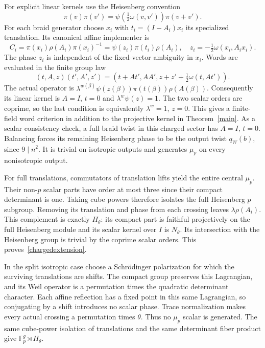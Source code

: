 \documentclass[11pt]{amsart}
\newcommand{\Fp}{\mathbb F_p}
\begin{document}
For explicit linear kernels use the Heisenberg convention
\[
\pi(v)\pi(v')=\psi(\tfrac12\omega(v,v'))\pi(v+v').
\]
For each braid generator choose $x_i$ with
$t_i=(I-A_i)x_i$ its specialized translation. Its canonical affine
implementer is
\[
C_i=\pi(x_i)\rho(A_i)\pi(x_i)^{-1}
=\psi(z_i)\pi(t_i)\rho(A_i),\quad
z_i=-\tfrac12\omega(x_i,A_ix_i).
\]
The phase $z_i$ is independent of the fixed-vector ambiguity in $x_i$.
Words are evaluated in the finite group law
\[
(t,A,z)(t',A',z')=
(t+At',AA',z+z'+\tfrac12\omega(t,At')).
\]
The actual operator is $\lambda^{w(\beta)}\psi(z(\beta))
\pi(t(\beta))\rho(A(\beta))$. Consequently its linear kernel is
$A=I$, $t=0$ and $\lambda^w\psi(z)=1$. The two scalar orders are
coprime, so the last condition is equivalently $\lambda^w=1$, $z=0$.
This gives a finite-field word criterion in addition to the projective
kernel in Theorem~\ref{main}.
As a scalar consistency check, a full braid twist in this charged
sector has $A=I$, $t=0$. Balancing forces its remaining Heisenberg
phase to be the output twist $q_W(b)$, since $9\mid n^2$.
It is trivial on isotropic outputs and generates $\mu_p$ on every
nonisotropic output.

For full translations, commutators of translation lifts yield the
entire central $\mu_p$. Their non-$p$ scalar parts have order at most
three since their compact determinant is one. Taking cube powers
therefore isolates the full Heisenberg $p$ subgroup. Removing its
translation and phase from each crossing leaves $\lambda\rho(A_i)$.
This complement is exactly $H_\theta$: its compact part is faithful
projectively on the full Heisenberg module and its scalar kernel
over $I$ is $N_\theta$. Its intersection with the Heisenberg group
is trivial by the coprime scalar orders. This proves~\eqref{chargedextension}.

In the split isotropic case choose a Schr\"odinger polarization for
which the surviving translations are shifts. The compact group
preserves this Lagrangian, and its Weil operator is a permutation
times the quadratic determinant character. Each affine reflection
has a fixed point in this same Lagrangian, so conjugating by a shift
introduces no scalar phase. Trace normalization makes every actual
crossing a permutation times $\theta$. Thus no $\mu_p$ scalar is
generated. The same cube-power isolation of translations and the
same determinant fiber product give $\Fp^g\rtimes H_\theta$.
\end{document}
